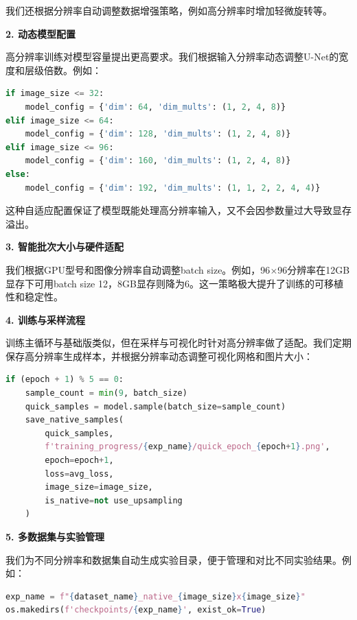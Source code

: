\documentclass{ctexart}
\begin{document}
我们还根据分辨率自动调整数据增强策略，例如高分辨率时增加轻微旋转等。

\vspace{0.5em}
\noindent
\textbf{2. 动态模型配置}

高分辨率训练对模型容量提出更高要求。我们根据输入分辨率动态调整U-Net的宽度和层级倍数。例如：

\begin{lstlisting}[language=python]
if image_size <= 32:
    model_config = {'dim': 64, 'dim_mults': (1, 2, 4, 8)}
elif image_size <= 64:
    model_config = {'dim': 128, 'dim_mults': (1, 2, 4, 8)}
elif image_size <= 96:
    model_config = {'dim': 160, 'dim_mults': (1, 2, 4, 8)}
else:
    model_config = {'dim': 192, 'dim_mults': (1, 1, 2, 2, 4, 4)}
\end{lstlisting}

这种自适应配置保证了模型既能处理高分辨率输入，又不会因参数量过大导致显存溢出。

\vspace{0.5em}
\noindent
\textbf{3. 智能批次大小与硬件适配}

我们根据GPU型号和图像分辨率自动调整batch size。例如，96$\times$96分辨率在12GB显存下可用batch size 12，8GB显存则降为6。这一策略极大提升了训练的可移植性和稳定性。

\vspace{0.5em}
\noindent
\textbf{4. 训练与采样流程}

训练主循环与基础版类似，但在采样与可视化时针对高分辨率做了适配。我们定期保存高分辨率生成样本，并根据分辨率动态调整可视化网格和图片大小：

\begin{lstlisting}[language=python]
if (epoch + 1) % 5 == 0:
    sample_count = min(9, batch_size)
    quick_samples = model.sample(batch_size=sample_count)
    save_native_samples(
        quick_samples,
        f'training_progress/{exp_name}/quick_epoch_{epoch+1}.png',
        epoch=epoch+1,
        loss=avg_loss,
        image_size=image_size,
        is_native=not use_upsampling
    )
\end{lstlisting}

\vspace{0.5em}
\noindent
\textbf{5. 多数据集与实验管理}

我们为不同分辨率和数据集自动生成实验目录，便于管理和对比不同实验结果。例如：

\begin{lstlisting}[language=python]
exp_name = f"{dataset_name}_native_{image_size}x{image_size}"
os.makedirs(f'checkpoints/{exp_name}', exist_ok=True)
\end{lstlisting}
\end{document}
